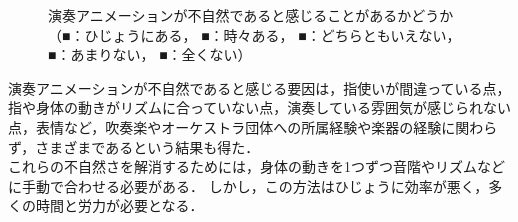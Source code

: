 \begin{figure}[h]
	\centering
	\hspace{5mm}
	\hspace{5mm}
	\caption{演奏アニメーションが不自然であると感じることがあるかどうか\\
		（{\color{legend1}■}：ひじょうにある，
		{\color{legend2}■}：時々ある，
		{\color{legend3}■}：どちらともいえない，
		{\color{legend4}■}：あまりない，
		{\color{legend5}■}：全くない）}
	\label{fig:q1}
\end{figure}
\par
演奏アニメーションが不自然であると感じる要因は，指使いが間違っている点，指や身体の動きがリズムに合っていない点，演奏している雰囲気が感じられない点，表情など，吹奏楽やオーケストラ団体への所属経験や楽器の経験に関わらず，さまざまであるという結果も得た．\\
\indent
これらの不自然さを解消するためには，身体の動きを1つずつ音階やリズムなどに手動で合わせる必要がある．
しかし，この方法はひじょうに効率が悪く，多くの時間と労力が必要となる．
\newpage
